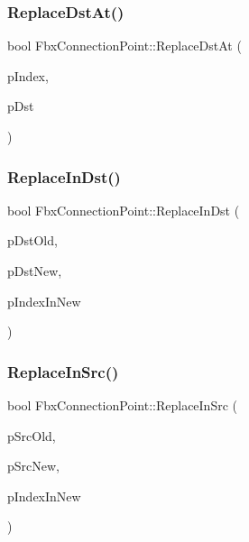 \subsubsection{\texorpdfstring{Replace\+Dst\+At()}{ReplaceDstAt()}}
{\footnotesize\ttfamily bool Fbx\+Connection\+Point\+::\+Replace\+Dst\+At (\begin{DoxyParamCaption}\item[{int}]{p\+Index,  }\item[{\hyperlink{class_fbx_connection_point}{Fbx\+Connection\+Point} $\ast$}]{p\+Dst }\end{DoxyParamCaption})}

\mbox{\label{class_fbx_connection_point_ae1d8edf287d969906c1dd1cc4e666df9}} 
\subsubsection{\texorpdfstring{Replace\+In\+Dst()}{ReplaceInDst()}}
{\footnotesize\ttfamily bool Fbx\+Connection\+Point\+::\+Replace\+In\+Dst (\begin{DoxyParamCaption}\item[{\hyperlink{class_fbx_connection_point}{Fbx\+Connection\+Point} $\ast$}]{p\+Dst\+Old,  }\item[{\hyperlink{class_fbx_connection_point}{Fbx\+Connection\+Point} $\ast$}]{p\+Dst\+New,  }\item[{int}]{p\+Index\+In\+New }\end{DoxyParamCaption})}

\mbox{\label{class_fbx_connection_point_a89908a3270dbf639a9973c8271d7a6ad}} 
\subsubsection{\texorpdfstring{Replace\+In\+Src()}{ReplaceInSrc()}}
{\footnotesize\ttfamily bool Fbx\+Connection\+Point\+::\+Replace\+In\+Src (\begin{DoxyParamCaption}\item[{\hyperlink{class_fbx_connection_point}{Fbx\+Connection\+Point} $\ast$}]{p\+Src\+Old,  }\item[{\hyperlink{class_fbx_connection_point}{Fbx\+Connection\+Point} $\ast$}]{p\+Src\+New,  }\item[{int}]{p\+Index\+In\+New }\end{DoxyParamCaption})}

